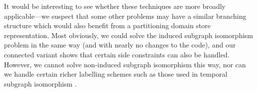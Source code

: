 It would be interesting to see whether these techniques are more broadly
applicable---we suspect that some other problems may have a similar branching
structure which would also benefit from a partitioning domain store
representation. Most obviously, we could solve the induced subgraph isomorphism
problem in the same way (and with nearly no changes to the code), and our
connected variant shows that certain side constraints can also be handled.
However, we cannot solve non-induced subgraph isomorphism this way, nor can
we handle certain richer labelling schemes such as those used in temporal
subgraph isomorphism \citep{DBLP:conf/asunam/RedmondC13}.

% 
% 
% 
% 
